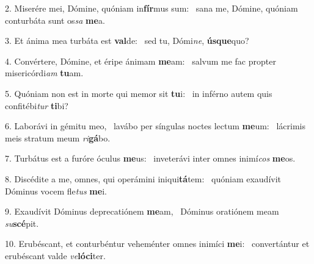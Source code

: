 2. Miserére mei, Dómine, quóniam in\textbf{fír}mus sum: \ast\  sana me, Dómine, quóniam conturbáta sunt os\textit{sa} \textbf{me}a.\

3. Et ánima mea turbáta est \textbf{val}de: \ast\  sed tu, Dómi\textit{ne}, \textbf{ús}\textbf{que}quo?\

4. Convértere, Dómine, et éripe ánimam \textbf{me}am: \ast\  salvum me fac propter misericórdi\textit{am} \textbf{tu}am.\

5. Quóniam non est in morte qui memor sit \textbf{tu}i: \ast\  in inférno autem quis confitébi\textit{tur} \textbf{ti}bi?\

6. Laborávi in gémitu meo, \dag\  lavábo per síngulas noctes lectum \textbf{me}um: \ast\  lácrimis meis stratum meum \textit{ri}\textbf{gá}bo.\

7. Turbátus est a furóre óculus \textbf{me}us: \ast\  inveterávi inter omnes inimí\textit{cos} \textbf{me}os.\

8. Discédite a me, omnes, qui operámini iniqui\textbf{tá}tem: \ast\  quóniam exaudívit Dóminus vocem fle\textit{tus} \textbf{me}i.\

9. Exaudívit Dóminus deprecatiónem \textbf{me}am, \ast\  Dóminus oratiónem meam \textit{su}\textbf{scé}pit.\

10. Erubéscant, et conturbéntur veheménter omnes inimíci \textbf{me}i: \ast\  convertántur et erubéscant valde \textit{ve}\textbf{ló}\textbf{ci}ter.\

